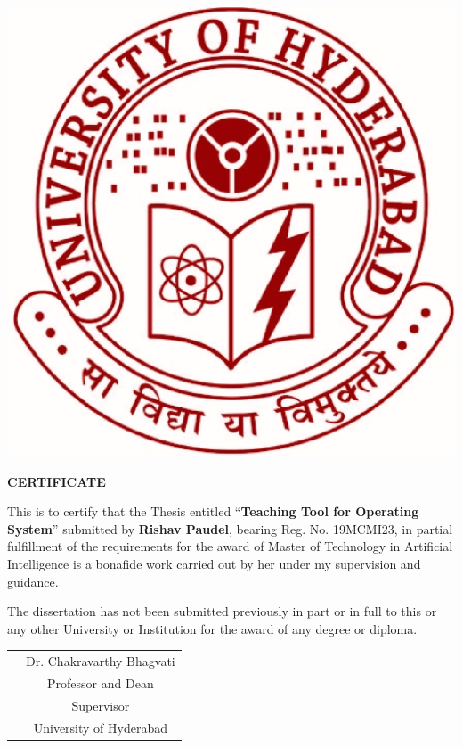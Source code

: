 \begin{onehalfspacing}
\clearpage
\thispagestyle{empty}
\begin{center}
\includegraphics[scale=0.3]{./uohyd.eps}\\

\begin{Large}
\textbf{CERTIFICATE}\\
\end{Large}
\end{center}

        This is to certify that the Thesis entitled ``\textbf{Teaching Tool for Operating System}'' submitted by \textbf{Rishav Paudel}, bearing Reg. No. 19MCMI23, in partial fulfillment of the requirements for the award of Master of Technology in Artificial Intelligence is a bonafide work carried out by her under my supervision and guidance. 
        
        
The dissertation has not been submitted previously in part or in full to this or any other University or Institution for the award of any degree or diploma.
\\[2.0cm]

	

\begin{table}[h]
\begin{tabular}{cc} 
            &\hspace{8 cm}  Dr. Chakravarthy Bhagvati \\
                         &\hspace{8 cm} Professor and Dean \\
                         &\hspace{8 cm} Supervisor\\
                 &\hspace{8 cm}   University of Hyderabad                  
              
        
\end{tabular}
\end{table}


\end{onehalfspacing}
